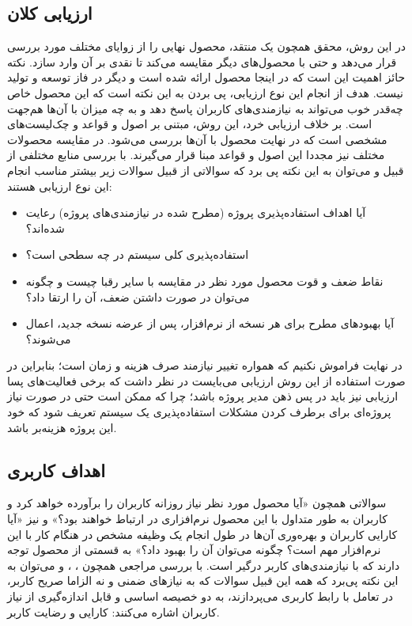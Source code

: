 \subsection{ارزیابی کلان}
در این روش، محقق همچون یک منتقد، محصول نهایی را از زوایای مختلف مورد بررسی قرار می‌دهد و حتی با محصول‌های دیگر مقایسه می‌کند تا نقدی بر آن وارد سازد. نکته حائز اهمیت این است که در اینجا محصول ارائه شده است و دیگر در فاز توسعه و تولید نیست. هدف از انجام این نوع ارزیابی، پی بردن به این نکته است که این محصول خاص چه‌قدر خوب می‌تواند به نیازمندی‌های کاربران پاسخ دهد و به چه میزان با آن‌ها هم‌جهت است. بر خلاف ارزیابی خرد، این روش، مبتنی بر اصول و قواعد و چک‌لیست‌های مشخصی است که در نهایت محصول با آن‌ها بررسی می‌شود. در مقایسه محصولات مختلف نیز مجددا این اصول و قواعد مبنا قرار می‌گیرند. با بررسی منابع مختلفی از قبیل
\cite{sommerville_software_2016} و
\cite{pressman_software_2015}
می‌توان به این نکته پی برد که سوالاتی از قبیل سوالات زیر بیشتر مناسب انجام این نوع ارزیابی هستند:
\begin{itemize}
	\item 
	آیا اهداف استفاده‌پذیری پروژه (مطرح شده در نیازمندی‌های پروژه) رعایت شده‌اند؟
	\item 
	استفاده‌پذیری کلی سیستم در چه سطحی است؟
	\item 
	نقاط ضعف و قوت محصول مورد نظر در مقایسه با سایر رقبا چیست و چگونه می‌توان در صورت داشتن ضعف، آن را ارتقا داد؟
	\item 
	آیا بهبودهای مطرح برای هر نسخه از نرم‌افزار، پس از عرضه نسخه جدید، اعمال می‌شوند؟
\end{itemize}
در نهایت فراموش نکنیم که همواره تغییر نیازمند صرف هزینه و زمان است؛‌ بنابراین در صورت استفاده از این روش ارزیابی می‌بایست در نظر داشت که برخی فعالیت‌های پسا ارزیابی نیز باید در پس ذهن مدیر پروژه باشد؛ چرا که ممکن است حتی در صورت نیاز پروژه‌ای برای برطرف کردن مشکلات استفاده‌پذیری یک سیستم تعریف شود که خود این پروژه هزینه‌بر باشد.
\subsection{اهداف کاربری}
سوالاتی همچون «آیا محصول مورد نظر نیاز روزانه کاربران را برآورده خواهد کرد و کاربران به طور متداول با این محصول نرم‌افزاری در ارتباط خواهند بود؟» و نیز «آیا کارایی کاربران و بهره‌وری آن‌ها در طول انجام یک وظیفه مشخص در هنگام کار با این نرم‌افزار مهم است؟ چگونه می‌توان آن را بهبود داد؟» به قسمتی از محصول توجه دارند که با نیازمندی‌های کاربر درگیر است. با بررسی‌ مراجعی همچون
\cite{albert_measuring_2013}،
\cite{noauthor_measuringu:_2018}،
\cite{hewett_role_1986} و
\cite{abran_usability_2003}
می‌توان به این نکته پی‌برد که همه این قبیل سوالات که به نیازهای ضمنی و نه الزاما صریح کاربر، در تعامل با رابط کاربری می‌پردازند، به دو خصیصه اساسی و قابل اندازه‌گیری از نیاز کاربران اشاره می‌کنند: کارایی و رضایت کاربر.
